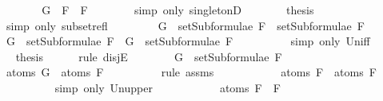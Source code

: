 \begin{isabellebody}
\ \ \ \ \isamarkupfalse%
\ \isamarkupfalse%
\ {\isachardoublequoteopen}G\ {\isacharequal}\ F{}\ \isactrlbold {\isasymand}\ F{}{\isachardoublequoteclose}\isanewline
\ \ \ \ \ \ \isamarkupfalse%
\ {\isacharparenleft}simp\ only{\isacharcolon}\ singletonD{\isacharparenright}\isanewline
\ \ \ \ \isamarkupfalse%
\ \isamarkupfalse%
\ {\isacharquery}thesis\isanewline
\ \ \ \ \ \ \isamarkupfalse%
\ {\isacharparenleft}simp\ only{\isacharcolon}\ subset{\isacharunderscore}refl{\isacharparenright}\isanewline
\ \ \isamarkupfalse%
\isanewline
\ \ \ \ \isamarkupfalse%
\ {\isachardoublequoteopen}G\ {\isasymin}\ setSubformulae\ F{}\ {\isasymunion}\ setSubformulae\ F{}{\isachardoublequoteclose}\isanewline
\ \ \ \ \isamarkupfalse%
\ \isamarkupfalse%
\ {\isachardoublequoteopen}G\ {\isasymin}\ setSubformulae\ F{}\ {\isasymor}\ G\ {\isasymin}\ setSubformulae\ F{}{\isachardoublequoteclose}\ \ \isanewline
\ \ \ \ \ \ \isamarkupfalse%
\ {\isacharparenleft}simp\ only{\isacharcolon}\ Un{\isacharunderscore}iff{\isacharparenright}\isanewline
\ \ \ \ \isamarkupfalse%
\ \isamarkupfalse%
\ {\isacharquery}thesis\isanewline
\ \ \ \ \isamarkupfalse%
\ {\isacharparenleft}rule\ disjE{\isacharparenright}\isanewline
\ \ \ \ \ \ \isamarkupfalse%
\ {\isachardoublequoteopen}G\ {\isasymin}\ setSubformulae\ F{}{\isachardoublequoteclose}\isanewline
\ \ \ \ \ \ \isamarkupfalse%
\ \isamarkupfalse%
\ {\isachardoublequoteopen}atoms\ G\ {\isasymsubseteq}\ atoms\ F{}{\isachardoublequoteclose}\isanewline
\ \ \ \ \ \ \ \ \isamarkupfalse%
\ {\isacharparenleft}rule\ assms{\isacharparenleft}{}{\isacharparenright}{\isacharparenright}\isanewline
\ \ \ \ \ \ \isamarkupfalse%
\ \isamarkupfalse%
\ {\isachardoublequoteopen}{\isasymdots}\ {\isasymsubseteq}\ atoms\ F{}\ {\isasymunion}\ atoms\ F{}{\isachardoublequoteclose}\isanewline
\ \ \ \ \ \ \ \ \isamarkupfalse%
\ {\isacharparenleft}simp\ only{\isacharcolon}\ Un{\isacharunderscore}upper{}{\isacharparenright}\isanewline
\ \ \ \ \ \ \isamarkupfalse%
\ \isamarkupfalse%
\ {\isachardoublequoteopen}{\isasymdots}\ {\isacharequal}\ atoms\ {\isacharparenleft}F{}\ \isactrlbold {\isasymand}\ F{}{\isacharparenright}{\isachardoublequoteclose}\isanewline

\end{isabellebody}
